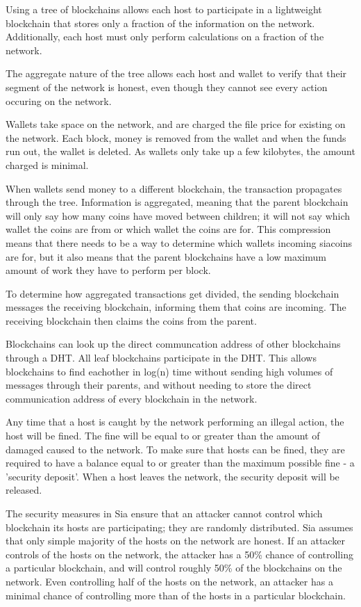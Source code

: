 \documentclass[twocolumn]{article}
\begin{document}
Using a tree of blockchains allows each host to participate in a lightweight blockchain that stores only a fraction of the information on the network.
Additionally, each host must only perform calculations on a fraction of the network.

The aggregate nature of the tree allows each host and wallet to verify that their segment of the network is honest, even though they cannot see every action occuring on the network.

Wallets take space on the network, and are charged the file price for existing on the network.
Each block, money is removed from the wallet and when the funds run out, the wallet is deleted.
As wallets only take up a few kilobytes, the amount charged is minimal.

When wallets send money to a different blockchain, the transaction propagates through the tree.
Information is aggregated, meaning that the parent blockchain will only say how many coins have moved between children; it will not say which wallet the coins are from or which wallet the coins are for.
This compression means that there needs to be a way to determine which wallets incoming siacoins are for, but it also means that the parent blockchains have a low maximum amount of work they have to perform per block.

To determine how aggregated transactions get divided, the sending blockchain messages the receiving blockchain, informing them that coins are incoming.
The receiving blockchain then claims the coins from the parent.

Blockchains can look up the direct communcation address of other blockchains through a DHT.
All leaf blockchains participate in the DHT.
This allows blockchains to find eachother in log(n) time without sending high volumes of messages through their parents, and without needing to store the direct communication address of every blockchain in the network.

Any time that a host is caught by the network performing an illegal action, the host will be fined.
The fine will be equal to or greater than the amount of damaged caused to the network.
To make sure that hosts can be fined, they are required to have a balance equal to or greater than the maximum possible fine - a 'security deposit'.
When a host leaves the network, the security deposit will be released.

The security measures in Sia ensure that an attacker cannot control which blockchain its hosts are participating; they are randomly distributed.
Sia assumes that only simple majority of the hosts on the network are honest.
If an attacker controls \fortynine{} of the hosts on the network, the attacker has a 50\% chance of controlling a particular blockchain, and will control roughly 50\% of the blockchains on the network.
Even controlling half of the hosts on the network, an attacker has a minimal chance of controlling more than \maxcorruption{} of the hosts in a particular blockchain.
\end{document}
